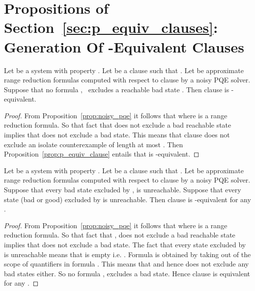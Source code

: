 \section*{Propositions of Section~\ref{sec:p_equiv_clauses}: Generation Of -Equivalent Clauses}
\begin{proposition}
Let  be a system with property . Let  be a clause such
that . Let  be approximate
range reduction formulas computed with respect to clause  by a
noisy PQE solver.  Suppose that no formula ,~
excludes a reachable bad state . Then clause  is
-equivalent.
\end{proposition}
\begin{proof}
From Proposition~\ref{prop:noisy_pqe} it follows
that  where  is a range reduction formula.  So
that fact that  does not exclude a bad reachable state implies
that  does not exclude a bad state. This means that clause 
does not exclude an isolate counterexample of length at most . Then
Proposition~\ref{prop:p_equiv_clause} entails that  is
-equivalent.
\end{proof}

\begin{proposition}
Let  be a system with property . Let  be a clause such
that . Let  be approximate
range reduction formulas computed with respect to clause  by a
noisy PQE solver. Suppose that every bad state excluded by ,  is unreachable. Suppose that every state (bad or good)
excluded by  is unreachable. Then clause  is
-equivalent for any .
\end{proposition}
\begin{proof}
From Proposition~\ref{prop:noisy_pqe} it follows
that  where  is a range reduction formula.  So
that fact that ,  does not exclude a bad
reachable state implies that  does not exclude a bad state.  The
fact that every state excluded by  is unreachable means that
 is empty i.e. . Formula  is obtained by
taking  out of the scope of quantifiers in
formula . This means that
 and hence  does not exclude any bad states
either. So no formula ,  excludes a bad state. Hence clause
 is  equivalent for any .
\end{proof}
